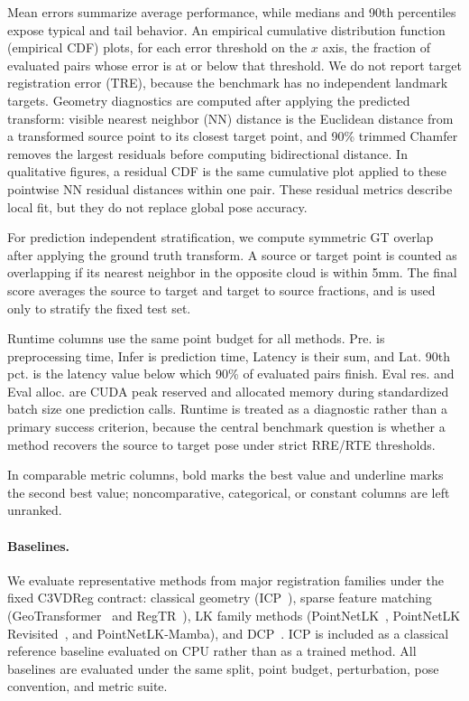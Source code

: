 \documentclass{bmvc2k}
\begin{document}
Mean errors summarize average performance, while medians and 90th percentiles expose typical and tail behavior. An empirical cumulative distribution function (empirical CDF) plots, for each error threshold on the $x$ axis, the fraction of evaluated pairs whose error is at or below that threshold. We do not report target registration error (TRE), because the benchmark has no independent landmark targets. Geometry diagnostics are computed after applying the predicted transform: visible nearest neighbor (NN) distance is the Euclidean distance from a transformed source point to its closest target point, and 90\% trimmed Chamfer removes the largest residuals before computing bidirectional distance. In qualitative figures, a residual CDF is the same cumulative plot applied to these pointwise NN residual distances within one pair. These residual metrics describe local fit, but they do not replace global pose accuracy.

For prediction independent stratification, we compute symmetric GT overlap after applying the ground truth transform. A source or target point is counted as overlapping if its nearest neighbor in the opposite cloud is within 5mm. The final score averages the source to target and target to source fractions, and is used only to stratify the fixed test set.

Runtime columns use the same point budget for all methods. Pre. is preprocessing time, Infer is prediction time, Latency is their sum, and Lat. 90th pct. is the latency value below which 90\% of evaluated pairs finish. Eval res. and Eval alloc. are CUDA peak reserved and allocated memory during standardized batch size one prediction calls. Runtime is treated as a diagnostic rather than a primary success criterion, because the central benchmark question is whether a method recovers the source to target pose under strict RRE/RTE thresholds.

In comparable metric columns, bold marks the best value and underline marks the second best value; noncomparative, categorical, or constant columns are left unranked.

\paragraph{Baselines.}
\label{sec:baseline_initialization}

We evaluate representative methods from major registration families under the fixed C3VDReg contract: classical geometry (ICP~\cite{besl1992method}), sparse feature matching (GeoTransformer~\cite{qin2022geometric} and RegTR~\cite{yew2022regtr}), LK family methods (PointNetLK~\cite{aoki2019pointnetlk}, PointNetLK Revisited~\cite{li2021pointnetlk}, and PointNetLK-Mamba), and DCP~\cite{wang2019deep}. ICP is included as a classical reference baseline evaluated on CPU rather than as a trained method. All baselines are evaluated under the same split, point budget, perturbation, pose convention, and metric suite.
\end{document}
